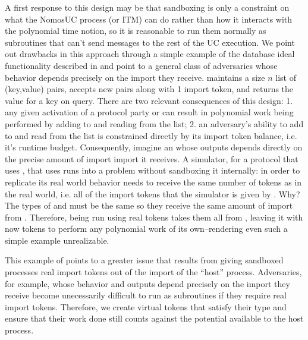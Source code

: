 A first response to this design may be that sandboxing is only a constraint
on what the NomosUC process (or ITM) can do rather than how it interacts with 
the polynomial time notion, so it is reasonable to run them normally as subroutines 
that can't send messages to the rest of the UC execution. 
We point out drawbacks in this approach through a simple example of the database
ideal functionality \Fdb described in \cite{hofheinzpoly} and point to a general
class of adversaries whose behavior depends precisely on the import they receive.
\Fdb maintains a size $n$ list of (key,value) pairs, accepts new pairs along with 1 import token, and returns the value
for a key on query. There are two relevant consequences of this design: 1. any given activation 
of a protocol party or \Adv can result in polynomial work being performed by adding to and 
reading from the list; 2. an adversary's ability to add to and read from the list is constrained
directly by its import token balance, i.e. it's runtime budget. 
Consequently, imagine an \Adv whose outputs depends directly on the precise amount of import 
import it receives. A simulator, for a protocol that uses \Fdb, that uses \Adv runs into a 
problem without sandboxing it internally: in order to replicate its real world
behavior \Adv needs to receive the same number of tokens as in the real world, i.e. all of the import tokens that the 
simulator is given by \Z. Why? The types of \Adv and \Sim must be the same so they receive the 
same amount of import from \Z.
Therefore, \Adv being run using real tokens takes them all from \Sim, leaving it with now tokens
to perform any polynomial work of its own--rendering even such a simple example unrealizable.

This example of \Fdb points to a greater issue that results from giving sandboxed processes
real import tokens out of the import of the ``host'' process. Adversaries, for example, whose behavior and outputs
depend precisely on the import they receive become unecessarily difficult to run as subroutines 
if they require real import tokens. Therefore, we create virtual tokens 
that satisfy their type and ensure that their work done still counts against the potential
available to the host process.

